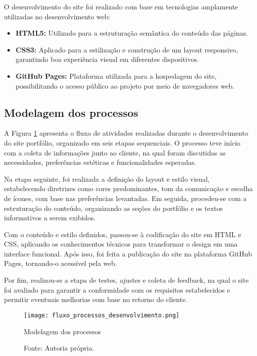 O desenvolvimento do site foi realizado com base em tecnologias amplamente utilizadas no desenvolvimento web:

\begin{itemize}
\item \textbf{HTML5:} Utilizado para a estruturação semântica do conteúdo das páginas.
\item \textbf{CSS3:} Aplicado para a estilização e construção de um layout responsivo, garantindo boa experiência visual em diferentes dispositivos.
\item \textbf{GitHub Pages:} Plataforma utilizada para a hospedagem do site, possibilitando o acesso público ao projeto por meio de navegadores web.
\end{itemize}

\subsection{Modelagem dos processos}

A Figura \ref{fig:Modelagem dos processos} apresenta o fluxo de atividades realizadas durante o desenvolvimento do site portfólio, organizado em seis etapas sequenciais. O processo teve início com a coleta de informações junto ao cliente, na qual foram discutidas as necessidades, preferências estéticas e funcionalidades esperadas.

Na etapa seguinte, foi realizada a definição do layout e estilo visual, estabelecendo diretrizes como cores predominantes, tom da comunicação e escolha de ícones, com base nas preferências levantadas. Em seguida, procedeu-se com a estruturação do conteúdo, organizando as seções do portfólio e os textos informativos a serem exibidos.

Com o conteúdo e estilo definidos, passou-se à codificação do site em HTML e CSS, aplicando os conhecimentos técnicos para transformar o design em uma interface funcional. Após isso, foi feita a publicação do site na plataforma GitHub Pages, tornando-o acessível pela web.

Por fim, realizou-se a etapa de testes, ajustes e coleta de feedback, na qual o site foi avaliado para garantir a conformidade com os requisitos estabelecidos e permitir eventuais melhorias com base no retorno do cliente.

\begin{figure}[h!]
    \centering
    \texttt{[image: fluxo\_processos\_desenvolvimento.png]}
    \caption{Modelagem dos processos}
    \caption*{Fonte: Autoria própria.}
    \label{fig:Modelagem dos processos}
\end{figure}